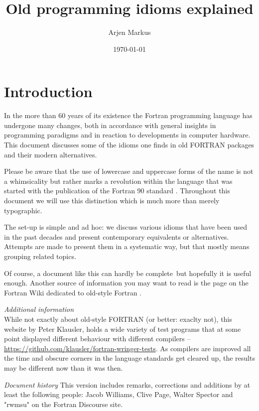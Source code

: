 \documentclass{article}
\date{\today}
\author{Arjen Markus}
\title{Old programming idioms explained}
\begin{document}
\maketitle

\tableofcontents
\newpage

\section{Introduction}
In the more than 60 years of its existence the Fortran programming
language has undergone many changes, both in accordance with general insights
in programming paradigms and in reaction to developments in computer hardware.
This document discusses some of the idioms one finds in old FORTRAN packages
and their modern alternatives.

Please be aware that the use of lowercase and uppercase forms of the name is
not a whimsicality but rather marks a revolution within the language that was
started with the publication of the Fortran 90 standard \cite{Fortran90Standard}. Throughout
this document we will use this distinction which is much more than merely
typographic.

The set-up is simple and ad hoc: we discuss various idioms that have been
used in the past decades and present contemporary equivalents or alternatives.
Attempts are made to present them in a systematic way, but that mostly means grouping
related topics.

Of course, a document like this can hardly be complete\, but hopefully it is
useful enough. Another source of information you may want to read is the page on the Fortran Wiki
dedicated to old-style Fortran \cite{ModernizeOldFortran}.

\emph{Additional information} \\
While not exactly about old-style FORTRAN (or better: exaclty not), this website by Peter Klausler,
holds a wide variety of test programs that at some point displayed different behaviour with
different compilers -- \url{https://github.com/klausler/fortran-wringer-tests}. As compilers
are improved all the time and obscure corners in the language standards get cleared up,
the results may be different now than it was then.

\emph{Document history}
This version includes remarks, corrections and additions by at least the following people: Jacob Williams,
Clive Page, Walter Spector and "rwmsu" on the Fortran Discourse site.











\end{document}
